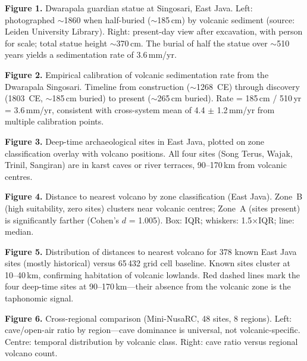 \documentclass[12pt]{article}
\begin{document}
\textbf{Figure 1.} Dwarapala guardian statue at Singosari, East Java. Left: photographed $\sim$1860 when half-buried ($\sim$185\,cm) by volcanic sediment (source: Leiden University Library). Right: present-day view after excavation, with person for scale; total statue height $\sim$370\,cm. The burial of half the statue over $\sim$510 years yields a sedimentation rate of 3.6\,mm/yr.

\textbf{Figure 2.} Empirical calibration of volcanic sedimentation rate from the Dwarapala Singosari. Timeline from construction ($\sim$1268~CE) through discovery (1803~CE, $\sim$185\,cm buried) to present ($\sim$265\,cm buried). Rate = 185\,cm / 510\,yr = 3.6\,mm/yr, consistent with cross-system mean of 4.4 $\pm$ 1.2\,mm/yr from multiple calibration points.

\textbf{Figure 3.} Deep-time archaeological sites in East Java, plotted on zone classification overlay with volcano positions. All four sites (Song Terus, Wajak, Trinil, Sangiran) are in karst caves or river terraces, 90--170\,km from volcanic centres.

\textbf{Figure 4.} Distance to nearest volcano by zone classification (East Java). Zone~B (high suitability, zero sites) clusters near volcanic centres; Zone~A (sites present) is significantly farther (Cohen's $d$ = 1.005). Box: IQR; whiskers: 1.5$\times$IQR; line: median.

\textbf{Figure 5.} Distribution of distances to nearest volcano for 378 known East Java sites (mostly historical) versus 65\,432 grid cell baseline. Known sites cluster at 10--40\,km, confirming habitation of volcanic lowlands. Red dashed lines mark the four deep-time sites at 90--170\,km---their absence from the volcanic zone is the taphonomic signal.

\textbf{Figure 6.} Cross-regional comparison (Mini-NusaRC, 48 sites, 8 regions). Left: cave/open-air ratio by region---cave dominance is universal, not volcanic-specific. Centre: temporal distribution by volcanic class. Right: cave ratio versus regional volcano count.
\end{document}
